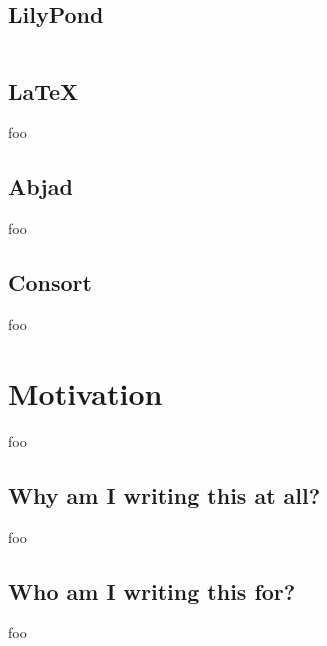 \begin{comment}
<abjad>
1 + 1
</abjad>
\end{comment}

\subsection{LilyPond}

\begin{singlespacing}
\vspace{-0.5\baselineskip}
\begin{lstlisting}
\end{lstlisting}
\end{singlespacing}

\subsection{LaTeX}

foo

\subsection{Abjad}

foo

\subsection{Consort}

foo

\section{Motivation}

foo

\subsection{Why am I writing this at all?}

foo

\subsection{Who am I writing this for?}

foo
